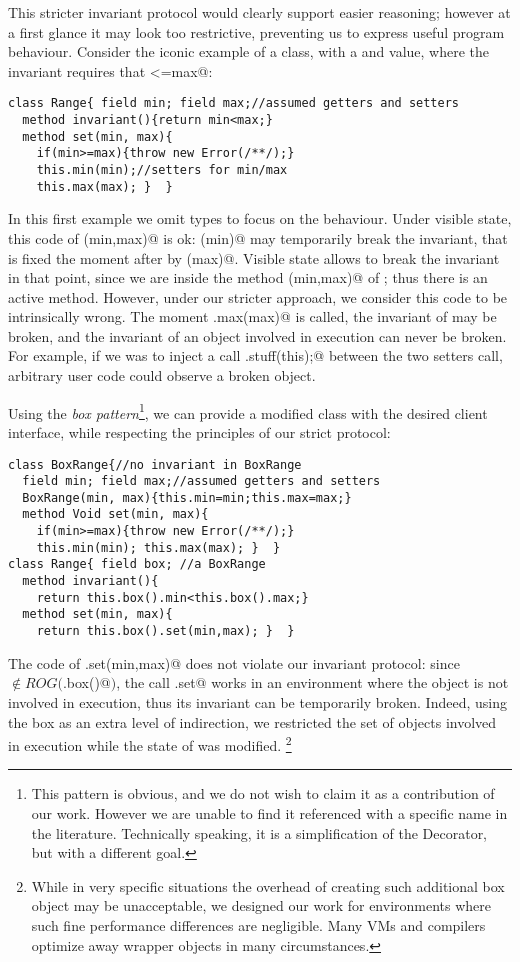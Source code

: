 This stricter invariant protocol would clearly support easier reasoning; however 
at a first glance it may look too restrictive, preventing us to express useful program behaviour.
Consider the iconic example of a \Q@Range@ class, with a \Q@min@ and \Q@max@
value, where the invariant requires that \Q@min<=max@:
\begin{lstlisting}
class Range{ field min; field max;//assumed getters and setters
  method invariant(){return min<max;}
  method set(min, max){
    if(min>=max){throw new Error(/**/);}
    this.min(min);//setters for min/max
    this.max(max); }  }
\end{lstlisting}
In this first example we omit types to focus on the behaviour.
Under visible state, this code of \Q@set(min,max)@ is ok:
\Q@min(min)@ may temporarily break the invariant, that is fixed the moment
after by \Q@max(max)@. Visible state allows to break the invariant in that point, since
we are inside the method \Q@set(min,max)@ of \Q@Range@; thus there is an active method.
However, under our stricter approach, we consider this code to be intrinsically wrong. The moment
\Q@this.max(max)@ is called, the invariant of \Q@this@ may be broken, and
the invariant of an object involved in execution can never be broken. For example, if we was to inject a call
\Q@Do.stuff(this);@ between the two setters call,
arbitrary user code could observe a broken object.

Using the \emph{box pattern}\footnote{
This pattern is obvious, and we do not wish to claim it as a contribution of our work.
However we are unable to find it referenced with a specific name in the literature. Technically speaking, it is a simplification of the Decorator, but with a different goal.}, we can provide a modified
\Q@Range@ class with the desired client interface, while respecting the principles of our strict protocol:
\begin{lstlisting}
class BoxRange{//no invariant in BoxRange
  field min; field max;//assumed getters and setters
  BoxRange(min, max){this.min=min;this.max=max;}
  method Void set(min, max){
    if(min>=max){throw new Error(/**/);}
    this.min(min); this.max(max); }  }
class Range{ field box; //a BoxRange
  method invariant(){
    return this.box().min<this.box().max;}
  method set(min, max){
    return this.box().set(min,max); }  }
\end{lstlisting}
The code of \Q@Range.set(min,max)@ does not violate our invariant protocol:
  since \Q@this@ $\notin \mathit{ROG}($\Q@this.box()@$)$, the call
\Q@BoxRange.set@ works in an environment where the \Q@Range@ object is
not involved in execution, thus its invariant can be temporarily broken.
Indeed, using the box as an extra level of indirection, we restricted the set of objects involved in execution while the state of \Q@Range@ was modified.
\footnote{While in very specific situations the overhead of creating such additional box object may be unacceptable, 
we designed our work for environments where such fine performance differences are negligible.
Many VMs and compilers optimize away wrapper objects in many circumstances.\cite{help}}

